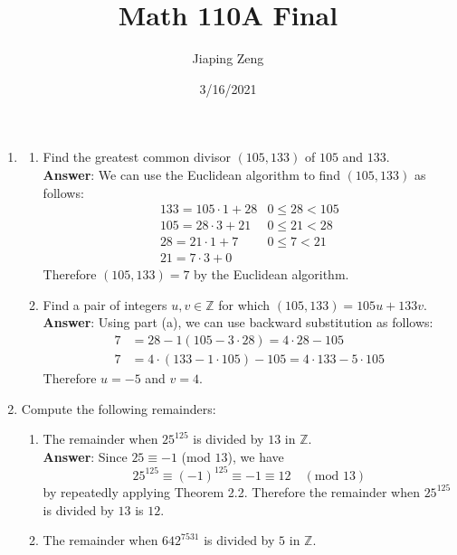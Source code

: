 \documentclass{article}
\title{Math 110A Final}
\date{3/16/2021}
\author{Jiaping Zeng}
\begin{document}

\begin{enumerate}
      \item \begin{enumerate}
                  \item Find the greatest common divisor $(105,133)$ of $105$ and $133$.\\
                        \textbf{Answer}: We can use the Euclidean algorithm to find $(105,133)$ as follows:
                        \[
                              \begin{array}{cc}
                                    133=105\cdot 1+28 & 0\leq 28<105 \\
                                    105=28\cdot 3+21  & 0\leq 21<28  \\
                                    28=21\cdot 1+7    & 0\leq 7<21   \\
                                    21=7\cdot 3+0
                              \end{array}
                        \]
                        Therefore $(105,133)=7$ by the Euclidean algorithm.
                  \item Find a pair of integers $u,v\in\mathbb{Z}$ for which $(105,133)=105u+133v$.\\
                        \textbf{Answer}: Using part (a), we can use backward substitution as follows:
                        \begin{align*}
                              7 & =28-1(105-3\cdot 28)=4\cdot 28-105                 \\
                              7 & =4\cdot (133-1\cdot 105)-105=4\cdot 133-5\cdot 105
                        \end{align*}
                        Therefore $u=-5$ and $v=4$.
            \end{enumerate}
      \item Compute the following remainders:
            \begin{enumerate}
                  \item The remainder when $25^{125}$ is divided by $13$ in $\mathbb{Z}$.\\
                        \textbf{Answer}: Since $25\equiv -1$ (mod $13$), we have \[25^{125}\equiv (-1)^{125}\equiv -1\equiv 12\quad(\text{mod }13)\] by repeatedly applying Theorem 2.2. Therefore the remainder when $25^{125}$ is divided by $13$ is $12$.
                  \item The remainder when $642^{7531}$ is divided by $5$ in $\mathbb{Z}$.\\

\end{enumerate}
\end{enumerate}
\end{document}
